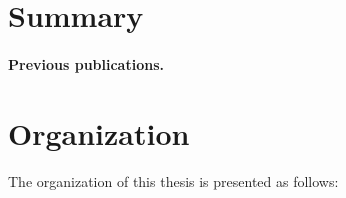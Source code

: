 


\section{Summary}

\paragraph{Previous publications.}

\section{Organization}

The organization of this thesis is presented as follows:

